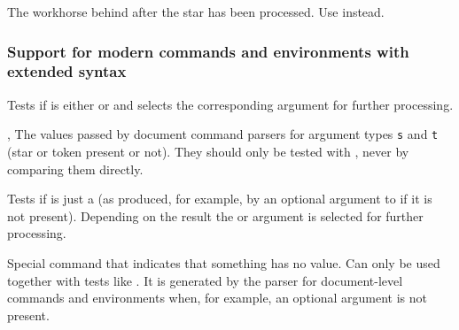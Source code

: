 \documentclass{l3in2edoc}
\begin{document}
\begin{function}[int]
  {
    \renew@environment
  }
  \begin{syntax}
         
  \end{syntax}
  The workhorse behind  after the star has been
  processed. Use  instead.
\end{function}



\subsubsection{Support for modern commands and environments with extended syntax}




\begin{function}[TF,user]
  {
    \IfBoolean
  }
  \begin{syntax}
       
  \end{syntax}
  Tests if  is either  or
   and selects the corresponding argument for further
  processing.
\end{function}

\begin{function}[]
  {
    \BooleanFalse,
    \BooleanTrue
  }
  The values passed by document command parsers for argument types
  \texttt{s} and \texttt{t} (star or token present or not). They
  should only be tested with , never by comparing them
  directly.
\end{function}





\begin{function}[TF,user]
  {
    \IfNoValue
  }
  \begin{syntax}
       
  \end{syntax}
  Tests if  is just a  (as produced, for
  example, by an optional argument to  if it is
  not present). Depending on the result the  or
   argument is selected for further processing.
\end{function}



\begin{function}[]
  {
    \NoValue
  }
  Special command that indicates that something has no value. Can only
  be used together with tests like . It is generated
  by the parser for document-level commands and environments when, for
  example, an optional argument is not present.
\end{function}
\end{document}

